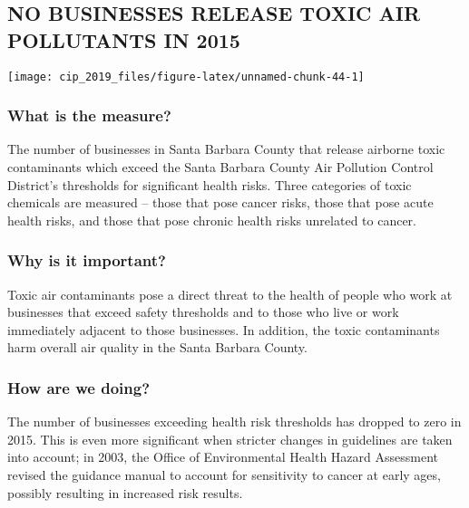 \documentclass[]{book}
\theoremstyle{definition}
\theoremstyle{definition}
\theoremstyle{definition}
\theoremstyle{remark}
\begin{document}
\subsection*{NO BUSINESSES RELEASE TOXIC AIR POLLUTANTS IN
2015}\label{no-businesses-release-toxic-air-pollutants-in-2015}

\texttt{[image: cip\_2019\_files/figure-latex/unnamed-chunk-44-1]}

\subsubsection*{What is the measure?}\label{what-is-the-measure-19}

The number of businesses in Santa Barbara County that release airborne
toxic contaminants which exceed the Santa Barbara County Air Pollution
Control District's thresholds for significant health risks. Three
categories of toxic chemicals are measured -- those that pose cancer
risks, those that pose acute health risks, and those that pose chronic
health risks unrelated to cancer.

\subsubsection*{Why is it important?}\label{why-is-it-important-18}

Toxic air contaminants pose a direct threat to the health of people who
work at businesses that exceed safety thresholds and to those who live
or work immediately adjacent to those businesses. In addition, the toxic
contaminants harm overall air quality in the Santa Barbara County.

\subsubsection*{How are we doing?}\label{how-are-we-doing-25}

The number of businesses exceeding health risk thresholds has dropped to
zero in 2015. This is even more significant when stricter changes in
guidelines are taken into account; in 2003, the Office of Environmental
Health Hazard Assessment revised the guidance manual to account for
sensitivity to cancer at early ages, possibly resulting in increased
risk results.
\end{document}
